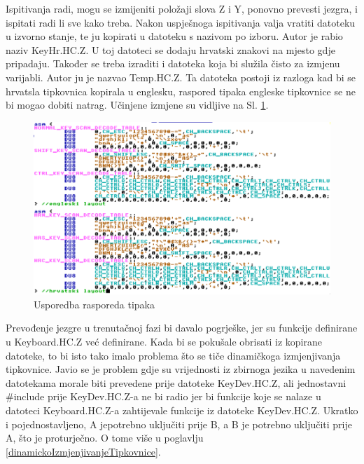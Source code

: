 \documentclass{foi}
\begin{document}
Ispitivanja radi, mogu se izmijeniti položaji slova {\selectfont Z} i {\selectfont Y}, ponovno prevesti jezgra, i ispitati radi li sve kako treba. Nakon uspješnoga ispitivanja valja vratiti datoteku u izvorno stanje, te ju kopirati u datoteku s nazivom po izboru. Autor je rabio naziv {\selectfont KeyHr.HC.Z}. U toj datoteci se dodaju hrvatski znakovi na mjesto gdje pripadaju. Također se treba izraditi i datoteka koja bi služila čisto za izmjenu varijabli. Autor ju je nazvao {\selectfont Temp.HC.Z}. Ta datoteka postoji iz razloga kad bi se hrvatsla tipkovnica kopirala u englesku, raspored tipaka engleske tipkovnice se ne bi mogao dobiti natrag. Učinjene izmjene su vidljive na Sl. \ref{fig:layouti}.

\begin{figure}[H]
    \centering
    \includegraphics[width=1.0\textwidth]{slike/layouti.png}
	\caption{Usporedba rasporeda tipaka}
    \label{fig:layouti}
\end{figure}

Prevođenje jezgre u trenutačnoj fazi bi davalo pogrješke, jer su funkcije definirane u {\selectfont Keyboard.HC.Z} već definirane. Kada bi se pokušale obrisati iz kopirane datoteke, to bi isto tako imalo problema što se tiče dinamičkoga izmjenjivanja tipkovnice. Javio se je problem gdje su vrijednosti iz zbirnoga jezika u navedenim datotekama morale biti prevedene prije datoteke {\selectfont KeyDev.HC.Z}, ali jednostavni {\selectfont \#include} prije {\selectfont KeyDev.HC.Z}-a ne bi radio jer bi funkcije koje se nalaze u datoteci {\selectfont Keyboard.HC.Z}-a zahtijevale funkcije iz datoteke {\selectfont KeyDev.HC.Z}. Ukratko i pojednostavljeno, A jepotrebno uključiti prije B, a B je potrebno uključiti prije A, što je proturječno. O tome više u poglavlju \ref{dinamickoIzmjenjivanjeTipkovnice}.
\end{document}
